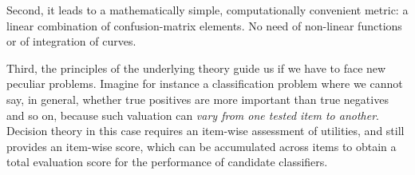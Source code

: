 \documentclass[\ifafour a4paper,12pt,\else a5paper,10pt,\fi%
onecolumn,oneside,article,%
british%
]{memoir}
\makeatletter
\newcommand*{\widefbox}[1]{\fbox{\hspace{1em}#1\hspace{1em}}}
\theoremstyle{remark}
\theoremstyle{innote}
\def\sum{\DOTSI\sumop\slimits@}
\newcommand*{\pencil}{{\fontencoding{U}\fontfamily{fontawesometwo}\selectfont\symbol{210}}}
\newcommand{\mynotep}[1]{{\footnotesize\color{notecolour}\pencil\ #1}}
\newcommand*{\de}{\partialup}%
\newcommand*{\p}{\mathrm{p}}%
\renewcommand*{\|}[1][]{\nonscript\:#1\vert\nonscript\:\mathopen{}}
\newcommand*{\tsum}{\mathop{\textstyle\sum}\nolimits}
\makeatother
\begin{document}
Second, it leads to a mathematically simple, computationally convenient metric: a linear combination of confusion-matrix elements. No need of non-linear functions or of integration of curves.

Third, the principles of the underlying theory guide us if we have to face new peculiar problems. Imagine for instance a classification problem where we cannot say, in general, whether true positives are more important than true negatives and so on, because such valuation can \emph{vary from one tested item to another}. Decision theory in this case requires an item-wise assessment of utilities, and still provides an item-wise score, which can be accumulated across items to obtain a total evaluation score for the performance of candidate classifiers.












\end{document}
